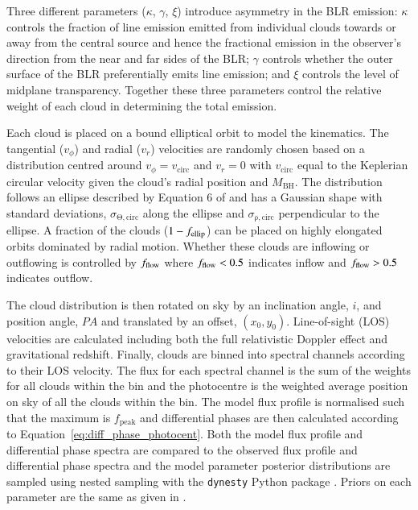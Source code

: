 \documentclass[longauth,]{aa}
\newcommand{\mbh}{{\mbox{$M_\mathrm{BH}$}}}
\begin{document}
Three different parameters ($\kappa$, $\gamma$, $\xi$) introduce asymmetry in the BLR emission: $\kappa$ controls the fraction of line emission emitted from individual clouds towards or away from the central source and hence the fractional emission in the observer's direction from the near and far sides of the BLR; $\gamma$ controls whether the outer surface of the BLR preferentially emits line emission; and $\xi$ controls the level of midplane transparency. Together these three parameters control the relative weight of each cloud in determining the total emission.

Each cloud is placed on a bound elliptical orbit to model the kinematics. The tangential ($v_{\phi}$) and radial ($v_r$) velocities are randomly chosen based on a distribution centred around $v_{\phi} = v_{\mathrm{circ}}$ and $v_r = 0$ with $v_{\mathrm{circ}}$ equal to the Keplerian circular velocity given the cloud's radial position and \mbh. The distribution follows an ellipse described by Equation 6 of  and has a Gaussian shape with standard deviations, $\sigma_{\mathrm{\Theta, circ}}$ along the ellipse and $\sigma_{\mathrm{\rho, circ}}$ perpendicular to the ellipse. A fraction of the clouds ($1 - f_{\rm ellip}$) can be placed on highly elongated orbits dominated by radial motion. Whether these clouds are inflowing or outflowing is controlled by $f_{\rm flow}$ where $f_{\rm flow} < 0.5$ indicates inflow and $f_{\rm flow} > 0.5$ indicates outflow.

The cloud distribution is then rotated on sky by an inclination angle, $i$, and position angle, $PA$ and translated by an offset, $(x_0, y_0)$. Line-of-sight (LOS) velocities are calculated including both the full relativistic Doppler effect and gravitational redshift. Finally, clouds are binned into spectral channels according to their LOS velocity. The flux for each spectral channel is the sum of the weights for all clouds within the bin and the photocentre is the weighted average position on sky of all the clouds within the bin. The model flux profile is normalised such that the maximum is $f_{\mathrm{peak}}$ and differential phases are then calculated according to Equation~\ref{eq:diff_phase_photocent}. Both the model flux profile and differential phase spectra are compared to the observed flux profile and differential phase spectra and the model parameter posterior distributions are sampled using nested sampling with the \texttt{dynesty} Python package \citep{Speagle2020MNRAS}. Priors on each parameter are the same as given in .
\end{document}
